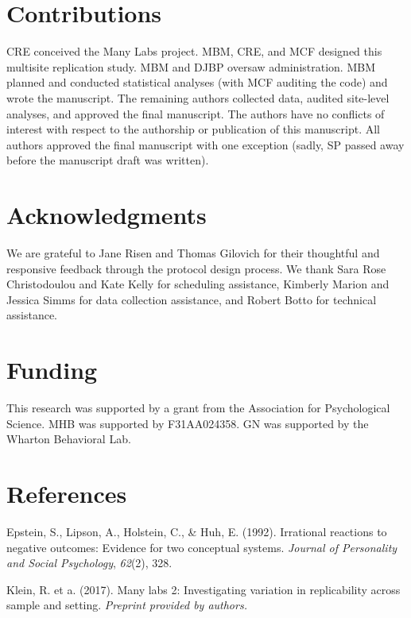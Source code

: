 \documentclass[english,floatsintext,man]{apa6}
\newcounter{author}
\theoremstyle{definition}
\theoremstyle{definition}
\theoremstyle{definition}
\theoremstyle{remark}
\begin{document}
\section{Contributions}\label{contributions}

CRE conceived the Many Labs project. MBM, CRE, and MCF designed this
multisite replication study. MBM and DJBP oversaw administration. MBM
planned and conducted statistical analyses (with MCF auditing the code)
and wrote the manuscript. The remaining authors collected data, audited
site-level analyses, and approved the final manuscript. The authors have
no conflicts of interest with respect to the authorship or publication
of this manuscript. All authors approved the final manuscript with one
exception (sadly, SP passed away before the manuscript draft was
written).

\section{Acknowledgments}\label{acknowledgments}

We are grateful to Jane Risen and Thomas Gilovich for their thoughtful
and responsive feedback through the protocol design process. We thank
Sara Rose Christodoulou and Kate Kelly for scheduling assistance,
Kimberly Marion and Jessica Simms for data collection assistance, and
Robert Botto for technical assistance.

\section{Funding}\label{funding}

This research was supported by a grant from the Association for
Psychological Science. MHB was supported by F31AA024358. GN was
supported by the Wharton Behavioral Lab.

\newpage

\section{References}\label{references}



\hypertarget{refs}{}
\hypertarget{ref-epstein}{}
Epstein, S., Lipson, A., Holstein, C., \& Huh, E. (1992). Irrational
reactions to negative outcomes: Evidence for two conceptual systems.
\emph{Journal of Personality and Social Psychology}, \emph{62}(2), 328.

\hypertarget{ref-ml2}{}
Klein, R. et a. (2017). Many labs 2: Investigating variation in
replicability across sample and setting. \emph{Preprint provided by
authors.}
\end{document}
